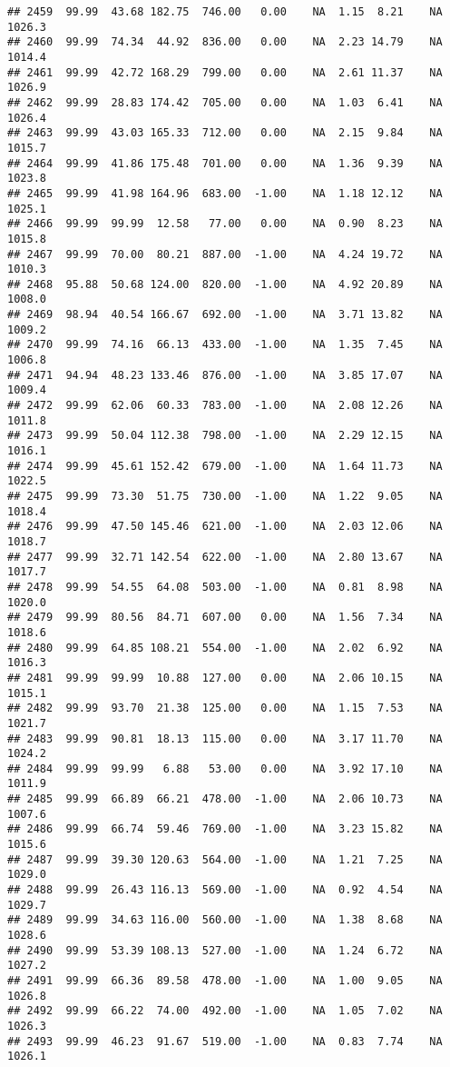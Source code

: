 \documentclass{article}\usepackage{graphicx, color}
\makeatletter
\newenvironment{kframe}{%
 \def\at@end@of@kframe{}%
 \ifinner\ifhmode%
  \def\at@end@of@kframe{\end{minipage}}%
  \begin{minipage}{\columnwidth}%
 \fi\fi%
 \def\FrameCommand##1{\hskip\@totalleftmargin \hskip-\fboxsep
 \colorbox{shadecolor}{##1}\hskip-\fboxsep
     \hskip-\linewidth \hskip-\@totalleftmargin \hskip\columnwidth}%
 \MakeFramed {\advance\hsize-\width
   \@totalleftmargin\z@ \linewidth\hsize
   \@setminipage}}%
 {\par\unskip\endMakeFramed%
 \at@end@of@kframe}
\newenvironment{knitrout}{}{} %
\makeatother
\begin{document}
\begin{knitrout}
\begin{kframe}
\begin{verbatim}
## 2459  99.99  43.68 182.75  746.00   0.00    NA  1.15  8.21    NA 1026.3
## 2460  99.99  74.34  44.92  836.00   0.00    NA  2.23 14.79    NA 1014.4
## 2461  99.99  42.72 168.29  799.00   0.00    NA  2.61 11.37    NA 1026.9
## 2462  99.99  28.83 174.42  705.00   0.00    NA  1.03  6.41    NA 1026.4
## 2463  99.99  43.03 165.33  712.00   0.00    NA  2.15  9.84    NA 1015.7
## 2464  99.99  41.86 175.48  701.00   0.00    NA  1.36  9.39    NA 1023.8
## 2465  99.99  41.98 164.96  683.00  -1.00    NA  1.18 12.12    NA 1025.1
## 2466  99.99  99.99  12.58   77.00   0.00    NA  0.90  8.23    NA 1015.8
## 2467  99.99  70.00  80.21  887.00  -1.00    NA  4.24 19.72    NA 1010.3
## 2468  95.88  50.68 124.00  820.00  -1.00    NA  4.92 20.89    NA 1008.0
## 2469  98.94  40.54 166.67  692.00  -1.00    NA  3.71 13.82    NA 1009.2
## 2470  99.99  74.16  66.13  433.00  -1.00    NA  1.35  7.45    NA 1006.8
## 2471  94.94  48.23 133.46  876.00  -1.00    NA  3.85 17.07    NA 1009.4
## 2472  99.99  62.06  60.33  783.00  -1.00    NA  2.08 12.26    NA 1011.8
## 2473  99.99  50.04 112.38  798.00  -1.00    NA  2.29 12.15    NA 1016.1
## 2474  99.99  45.61 152.42  679.00  -1.00    NA  1.64 11.73    NA 1022.5
## 2475  99.99  73.30  51.75  730.00  -1.00    NA  1.22  9.05    NA 1018.4
## 2476  99.99  47.50 145.46  621.00  -1.00    NA  2.03 12.06    NA 1018.7
## 2477  99.99  32.71 142.54  622.00  -1.00    NA  2.80 13.67    NA 1017.7
## 2478  99.99  54.55  64.08  503.00  -1.00    NA  0.81  8.98    NA 1020.0
## 2479  99.99  80.56  84.71  607.00   0.00    NA  1.56  7.34    NA 1018.6
## 2480  99.99  64.85 108.21  554.00  -1.00    NA  2.02  6.92    NA 1016.3
## 2481  99.99  99.99  10.88  127.00   0.00    NA  2.06 10.15    NA 1015.1
## 2482  99.99  93.70  21.38  125.00   0.00    NA  1.15  7.53    NA 1021.7
## 2483  99.99  90.81  18.13  115.00   0.00    NA  3.17 11.70    NA 1024.2
## 2484  99.99  99.99   6.88   53.00   0.00    NA  3.92 17.10    NA 1011.9
## 2485  99.99  66.89  66.21  478.00  -1.00    NA  2.06 10.73    NA 1007.6
## 2486  99.99  66.74  59.46  769.00  -1.00    NA  3.23 15.82    NA 1015.6
## 2487  99.99  39.30 120.63  564.00  -1.00    NA  1.21  7.25    NA 1029.0
## 2488  99.99  26.43 116.13  569.00  -1.00    NA  0.92  4.54    NA 1029.7
## 2489  99.99  34.63 116.00  560.00  -1.00    NA  1.38  8.68    NA 1028.6
## 2490  99.99  53.39 108.13  527.00  -1.00    NA  1.24  6.72    NA 1027.2
## 2491  99.99  66.36  89.58  478.00  -1.00    NA  1.00  9.05    NA 1026.8
## 2492  99.99  66.22  74.00  492.00  -1.00    NA  1.05  7.02    NA 1026.3
## 2493  99.99  46.23  91.67  519.00  -1.00    NA  0.83  7.74    NA 1026.1

\end{verbatim}
\end{kframe}
\end{knitrout}
\end{document}
